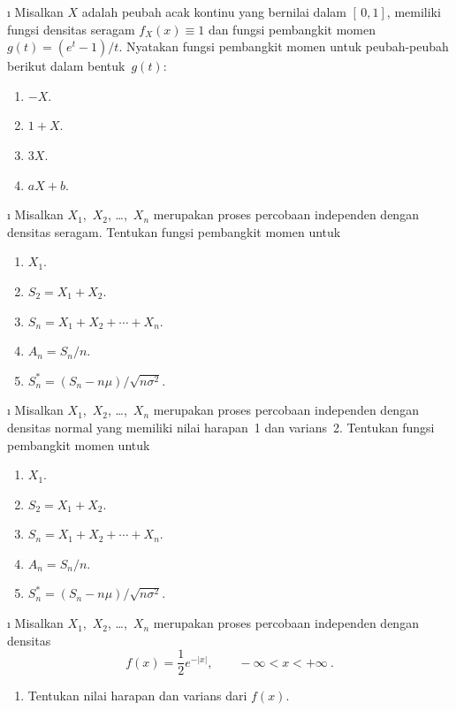 \begin{LJSItem}
\i\label{exer 10.3.7} Misalkan $X$ adalah peubah acak kontinu yang bernilai dalam $[\,0,1]$, 
memiliki fungsi densitas seragam $f_X(x) \equiv 1$ dan fungsi pembangkit momen $g(t) = (e^t
- 1)/t$.  Nyatakan fungsi pembangkit momen untuk peubah-peubah berikut dalam bentuk~$g(t)$:
\begin{enumerate}
\item $-X$.

\item $1 + X$.

\item $3X$.

\item $aX + b$.
\end{enumerate}

\i\label{exer 10.3.8} Misalkan $X_1$,~$X_2$, \ldots,~$X_n$ merupakan proses percobaan independen dengan
densitas seragam.  Tentukan fungsi pembangkit momen untuk
\begin{enumerate}
\item $X_1$.

\item $S_2 = X_1 + X_2$.

\item $S_n = X_1 + X_2 +\cdots+ X_n$.

\item $A_n = S_n/n$.

\item $S_n^* = (S_n - n\mu)/\sqrt{n\sigma^2}$.
\end{enumerate}

\i\label{exer 10.3.9} Misalkan $X_1$,~$X_2$, \ldots,~$X_n$ merupakan proses percobaan independen dengan
densitas normal yang memiliki nilai harapan~1 dan varians~2.  Tentukan fungsi pembangkit momen
untuk
\begin{enumerate}
\item $X_1$.

\item $S_2 = X_1 + X_2$.

\item $S_n = X_1 + X_2 +\cdots+ X_n$.

\item $A_n = S_n/n$.

\item $S_n^* = (S_n - n\mu)/\sqrt{n\sigma^2}$.
\end{enumerate}

\i\label{exer 10.3.10} Misalkan $X_1$,~$X_2$, \ldots,~$X_n$ merupakan proses percobaan independen dengan
densitas
$$
f(x) = \frac12 e^{-|x|}, \qquad -\infty < x < +\infty\ .
$$
\begin{enumerate}
\item Tentukan nilai harapan dan varians dari $f(x)$.


\end{enumerate}
\end{LJSItem}
